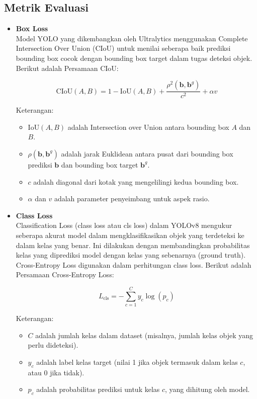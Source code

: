 \documentclass[journal,article,submit,pdftex,moreauthors]{Definitions/mdpi}
\begin{document}
\subsection{Metrik Evaluasi}
\begin{itemize}
    \item \textbf{Box Loss} \\
    Model YOLO yang dikembangkan oleh Ultralytics menggunakan Complete Intersection Over Union (CIoU) untuk menilai seberapa baik prediksi bounding box cocok dengan bounding box target dalam tugas deteksi objek\cite{Smith2023}. Berikut adalah Persamaan CIoU:
    
    \[
    \text{CIoU}(A, B) = 1 - \text{IoU}(A, B) + \frac{\rho^2(\mathbf{b}, \mathbf{b}^g)}{c^2} + \alpha v
    \]
    
    Keterangan:
    \begin{itemize}
        \setlength{\itemindent}{1em} %
        \item \( \text{IoU}(A, B) \) adalah Intersection over Union antara bounding box \( A \) dan \( B \).
        \item \( \rho(\mathbf{b}, \mathbf{b}^g) \) adalah jarak Euklidean antara pusat dari bounding box prediksi \( \mathbf{b} \) dan bounding box target \( \mathbf{b}^g \).
        \item \( c \) adalah diagonal dari kotak yang mengelilingi kedua bounding box.
        \item \( \alpha \) dan \( v \) adalah parameter penyeimbang untuk aspek rasio.
    \end{itemize}

    \item \textbf{Class Loss} \\
    Classification Loss (class loss atau cls loss) dalam YOLOv8 mengukur seberapa akurat model dalam mengklasifikasikan objek yang terdeteksi ke dalam kelas yang benar. Ini dilakukan dengan membandingkan probabilitas kelas yang diprediksi model dengan kelas yang sebenarnya (ground truth). Cross-Entropy Loss digunakan dalam perhitungan class loss\cite{Encord2023}. Berikut adalah Persamaan Cross-Entropy Loss:
    
    \[
        L_{\text{cls}} = - \sum_{c=1}^{C} y_c \log(p_c)
    \]
    
    Keterangan:
    \begin{itemize}
        \setlength{\itemindent}{1em} %
        \item \( C \) adalah jumlah kelas dalam dataset (misalnya, jumlah kelas objek yang perlu dideteksi).
        \item \( y_c \) adalah label kelas target (nilai 1 jika objek termasuk dalam kelas \( c \), atau 0 jika tidak).
        \item \( p_c \) adalah probabilitas prediksi untuk kelas \( c \), yang dihitung oleh model.
    \end{itemize}


\end{itemize}
\end{document}
